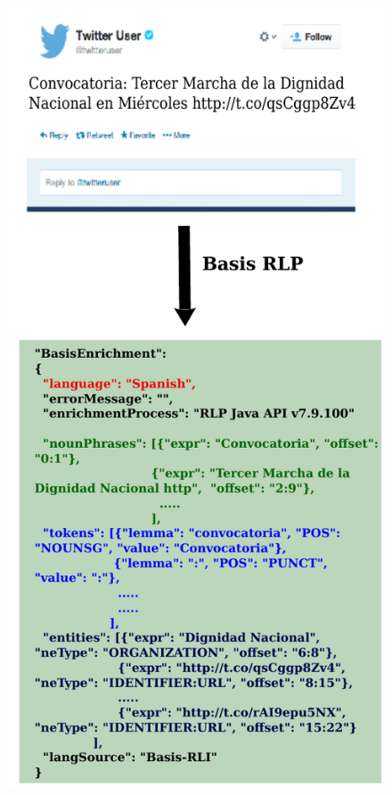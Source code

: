 \documentclass[red]{beamer}
\begin{document}
\begin{frame}
\begin{columns}
\begin{figure}
            \includegraphics[scale=0.3]{basis_enrichment}
        \end{figure}
    \end{columns}
\end{frame}
\end{document}
